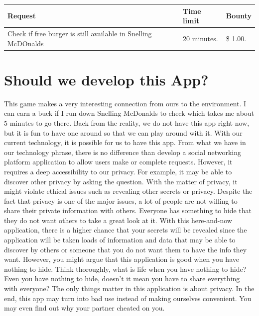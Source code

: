 \documentclass[12pt]{article}
\begin{document}
\begin{tabular}{l | l | l}
Request &Time limit& Bounty \\
\hline
Check if free burger is still available in Snelling McDOnalds
&
20 minutes. 
&
\$ 1.00. \\
\end{tabular}
\section{Should we develop this App?}
This game makes a very interesting connection from ours to the environment. I can earn a buck if I run down Snelling McDonalds to check which takes me about 5 minutes to go there. Back from the reality, we do not have this app right now, but it is fun to have one around so that we can play around with it. With our current technology, it is possible for us to have this app. From what we have in our technology phrase, there is no difference than develop a social networking platform application to allow users make or complete requests. However, it requires a deep accessibility to our privacy. For example, it may be able to discover other privacy by asking the question. With the matter of privacy, it might violate ethical issues such as revealing other secrets or privacy. Despite the fact that privacy is one of the major issues, a lot of people are not willing to share their private information with others. Everyone has something to hide that they do not want others to take a great look at it. With this here-and-now application, there is a higher chance that your secrets will be revealed since the application will be taken loads of information and data that may be able to discover by others or someone that you do not want them to have the info they want. However, you might argue that this application is good when you have nothing to hide. Think thoroughly, what is life when you have nothing to hide? Even you have nothing to hide, doesn't it mean you have to share everything with everyone? The only things matter in this application is about privacy. In the end, this app may turn into bad use instead of making ourselves convenient. You may even find out why your partner cheated on you.
\end{document}
